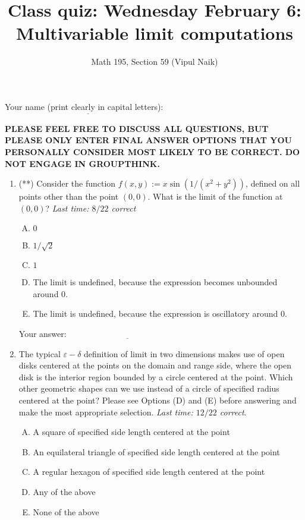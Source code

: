 \documentclass[10pt]{amsart}
\title{Class quiz: Wednesday February 6: Multivariable limit computations}
\author{Math 195, Section 59 (Vipul Naik)}
\begin{document}
\maketitle

Your name (print clearly in capital letters): $\underline{\qquad\qquad\qquad\qquad\qquad\qquad\qquad\qquad\qquad\qquad}$

{\bf PLEASE FEEL FREE TO DISCUSS ALL QUESTIONS, BUT PLEASE ONLY ENTER
FINAL ANSWER OPTIONS THAT YOU PERSONALLY CONSIDER MOST LIKELY TO BE
CORRECT. DO NOT ENGAGE IN GROUPTHINK.}

\begin{enumerate}
\item (**) Consider the function $f(x,y) := x \sin(1/(x^2 + y^2))$,
  defined on all points other than the point $(0,0)$. What is the
  limit of the function at $(0,0)$? {\em Last time: $8/22$ correct}

  \begin{enumerate}[(A)]
  \item $0$
  \item $1/\sqrt{2}$
  \item $1$
  \item The limit is undefined, because the expression becomes unbounded around $0$.
  \item The limit is undefined, because the expression is oscillatory
    around $0$.
  \end{enumerate}

  \vspace{0.1in}
  Your answer: $\underline{\qquad\qquad\qquad\qquad\qquad\qquad\qquad}$
  \vspace{0.1in}

\item The typical $\varepsilon-\delta$ definition of limit in two
  dimensions makes use of open disks centered at the points on the
  domain and range side, where the open disk is the interior region
  bounded by a circle centered at the point. Which other geometric
  shapes can we use instead of a circle of specified radius centered
  at the point? Please see Options (D) and (E) before answering and
  make the most appropriate selection. {\em Last time: $12/22$
  correct}.

  \begin{enumerate}[(A)]
  \item A square of specified side length centered at the point
  \item An equilateral triangle of specified side length centered at the point
  \item A regular hexagon of specified side length centered at the point
  \item Any of the above
  \item None of the above
  \end{enumerate}


\end{enumerate}
\end{document}
